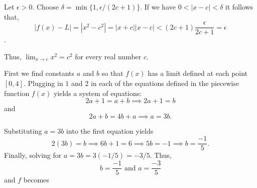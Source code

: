 \documentclass{report}
\begin{document}

\begin{myproof}
  Let $\epsilon > 0.$ Choose $\delta = \min\{1, \epsilon/(2c+1)\}$. If we have $0 < |x-c| < \delta$ it follows that, $$|f(x) - L| = |x^2 - c^2| = |x + c||x-c| < (2c+1)\frac{\epsilon}{2c+1} = \epsilon$$.

Thus, $\lim _{x \rightarrow c} x^2=c^2$ for every real number $c$.
\end{myproof}

\bigskip
\sol

First we find constants $a$ and $b$ so that $f(x)$ has a limit defined at each point $[0,4].$ Plugging in $1$ and $2$ in each of the equations defined in the piecewise function $f(x)$ yields a system of equations:$$ 2a +1 = a + b \implies 2a +1 = b$$
and $$2a +b = 4b + a \implies a = 3b.$$

Substituting $a = 3b$ into the first equation yields $$2(3b) = b \implies 6b + 1 =6 \implies 5b = -1 \implies b = \frac{-1}{5}.$$ Finally, solving for $a = 3b = 3 (-1/5) = -3/5.$ Thus, $$ b = \frac{-1}{5} \text { and } a = \frac{-3}{5} $$ and $f$ becomes
\end{document}
